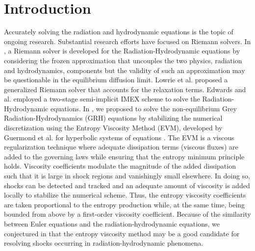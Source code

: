\documentclass{mc2015}
\begin{document}
\section{Introduction}\label{sec:intro}
%
Accurately solving the radiation and hydrodynamic equations is the topic of ongoing research. 
Substantial research efforts have focused on Riemann solvers. In
\cite{Balsara},  a Riemann solver is developed for the Radiation-Hydrodynamic equations by considering the frozen approximation 
that uncouples the two physics, radiation and hydrodynamics, components but the validity of such an approximation may be questionable 
in the equilibrium diffusion limit. 
Lowrie et al. \cite{LowrieMorelHittinger} proposed a generalized Riemann solver that accounts for the relaxation terms. 
Edwards and al. \cite{EdwardsMorelLowrie} employed a two-stage semi-implicit IMEX scheme to solve the Radiation-Hydrodynamic equations. 
%
%
In \cite{our_jcp_radhy_paper}, we proposed to solve the non-equilibrium Grey Radiation-Hydrodynamics (GRH) equations by stabilizing the numerical discretization 
using the Entropy Viscosity Method (EVM), developed by Guermond et al. for hyperbolic systems of equations \cite{jlg1, jlg2}. 
%
The EVM is a viscous regularization technique where adequate dissipation terms (viscous fluxes) are added to the governing laws while ensuring 
that the entropy minimum principle holds. Viscosity coefficients modulate the magnitude of the added dissipation such that it is large in shock regions and vanishingly 
small elsewhere. In doing so, shocks can be detected and tracked and an adequate amount of viscosity is added locally to stabilize the numerical scheme. 
Thus, the entropy viscosity coefficients are taken proportional to the entropy production while, at the same time, being bounded from above by a first-order 
viscosity coefficient.
Because of the similarity between Euler equations and the radiation-hydrodynamic equations, we conjectured in \cite{our_jcp_radhy_paper} that the entropy 
viscosity method may be a good candidate for resolving shocks occurring in radiation-hydrodynamic phenomena.
\end{document}
